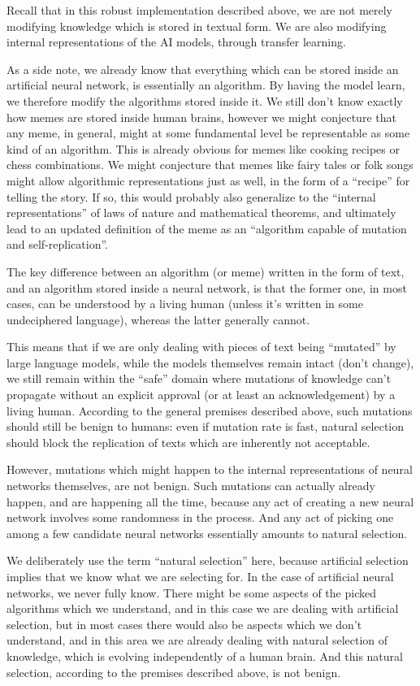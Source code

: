 \documentclass[12pt]{article}
\begin{document}
Recall that in this robust implementation described above, we are not merely modifying
knowledge which is stored in textual form. We are also modifying internal representations
of the AI models, through transfer learning.

As a side note, we already know that everything which can be stored inside an artificial
neural network, is essentially an algorithm. By having the model learn, we therefore
modify the algorithms stored inside it. We still don't know exactly how memes are stored
inside human brains, however we might conjecture that any meme, in general, might at some
fundamental level be representable as some kind of an algorithm. This is already obvious
for memes like cooking recipes or chess combinations. We might conjecture that memes like
fairy tales or folk songs might allow algorithmic representations just as well, in the
form of a ``recipe'' for telling the story. If so, this would probably also generalize to
the ``internal representations'' of laws of nature and mathematical theorems, and
ultimately lead to an updated definition of the meme as an ``algorithm capable of
mutation and self-replication''.

The key difference between an algorithm (or meme) written in the form of text, and an
algorithm stored inside a neural network, is that the former one, in most cases, can be
understood by a living human (unless it's written in some undeciphered language), whereas
the latter generally cannot.

This means that if we are only dealing with pieces of text being ``mutated'' by large
language models, while the models themselves remain intact (don't change), we still
remain within the ``safe'' domain where mutations of knowledge can't propagate without an
explicit approval (or at least an acknowledgement) by a living human. According to the
general premises described above, such mutations should still be benign to humans: even
if mutation rate is fast, natural selection should block the replication of texts which
are inherently not acceptable.

However, mutations which might happen to the internal representations of neural networks
themselves, are not benign. Such mutations can actually already happen, and are happening
all the time, because any act of creating a new neural network involves some randomness
in the process. And any act of picking one among a few candidate neural networks
essentially amounts to natural selection.

We deliberately use the term ``natural selection'' here, because artificial selection
implies that we know what we are selecting for. In the case of artificial neural
networks, we never fully know. There might be some aspects of the picked algorithms which
we understand, and in this case we are dealing with artificial selection, but in most
cases there would also be aspects which we don't understand, and in this area we are
already dealing with natural selection of knowledge, which is evolving independently of a
human brain. And this natural selection, according to the premises described above, is
not benign.
\end{document}
